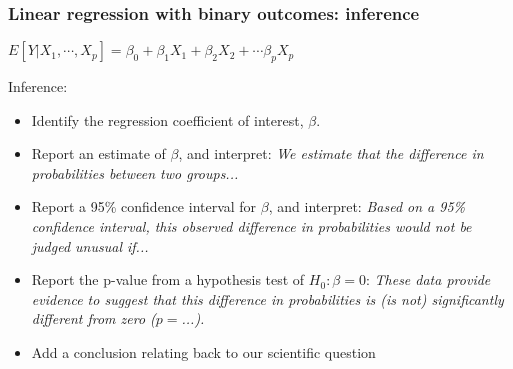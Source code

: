 \documentclass{beamer}
\begin{document}
\begin{frame}
	\frametitle{Linear regression with binary outcomes: inference}
	\begin{center} $E[Y|X_1,\cdots,X_p] = \beta_0 + \beta_1 X_1 + \beta_2 X_2 + \cdots \beta_p X_p$ \end{center}
	
	\vspace{-0.6cm}
	\color{blue} Inference: \vspace{-0.3cm} \color{black}
	\begin{itemize}
		\item Identify the regression coefficient of interest, $\beta$. \pause %
		\item Report an estimate of $\beta$, and interpret: \textit{We estimate that the difference in probabilities between two groups...} \pause
		\item Report a 95\% confidence interval for $\beta$, and interpret: \textit{Based on a 95\% confidence interval, this observed difference in probabilities would not be judged unusual if...} \pause
		\item Report the p-value from a hypothesis test of $H_0: \beta = 0$: \textit{These data provide evidence to suggest that this difference in probabilities is (is not) significantly different from zero ($p =$...).} \pause
		\item Add a conclusion relating back to our scientific question
	\end{itemize}
\end{frame}
\end{document}
